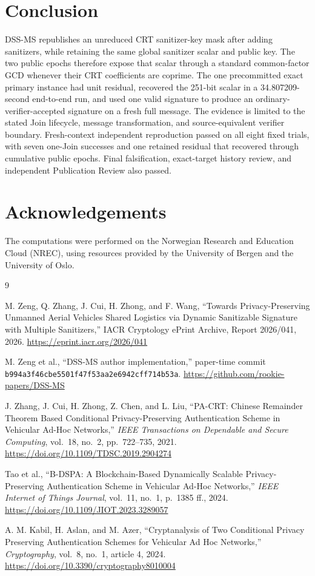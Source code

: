 \documentclass[10pt,a4paper]{article}
\begin{document}
\section{Conclusion}

DSS-MS republishes an unreduced CRT sanitizer-key mask after adding
sanitizers, while retaining the same global sanitizer scalar and public key.
The two public epochs therefore expose that scalar through a standard
common-factor GCD whenever their CRT coefficients are coprime. The one
precommitted exact primary instance had unit residual, recovered the 251-bit
scalar in a 34.807209-second end-to-end run, and used one valid signature to
produce an ordinary-verifier-accepted signature on a fresh full message. The
evidence is limited to the stated Join lifecycle, message transformation, and
source-equivalent verifier boundary. Fresh-context independent reproduction
passed on all eight fixed trials, with seven one-Join successes and one
retained residual that recovered through cumulative public epochs. Final
falsification, exact-target history review, and independent Publication Review
also passed.

\section*{Acknowledgements}
The computations were performed on the Norwegian Research and Education Cloud (NREC), using resources provided by the University of Bergen and the University of Oslo.

\begin{thebibliography}{9}

M. Zeng, Q. Zhang, J. Cui, H. Zhong, and F. Wang,
``Towards Privacy-Preserving Unmanned Aerial Vehicles Shared Logistics via
Dynamic Sanitizable Signature with Multiple Sanitizers,''
IACR Cryptology ePrint Archive, Report 2026/041, 2026.
\url{https://eprint.iacr.org/2026/041}

M. Zeng et al.,
``DSS-MS author implementation,'' paper-time commit
\texttt{b994a3f46cbe5501f47f53aa2e6942cff714b53a}.
\url{https://github.com/rookie-papers/DSS-MS}

J. Zhang, J. Cui, H. Zhong, Z. Chen, and L. Liu,
``PA-CRT: Chinese Remainder Theorem Based Conditional Privacy-Preserving
Authentication Scheme in Vehicular Ad-Hoc Networks,''
\emph{IEEE Transactions on Dependable and Secure Computing}, vol.~18, no.~2,
pp.~722--735, 2021.
\url{https://doi.org/10.1109/TDSC.2019.2904274}

Tao et al.,
``B-DSPA: A Blockchain-Based Dynamically Scalable Privacy-Preserving
Authentication Scheme in Vehicular Ad-Hoc Networks,''
\emph{IEEE Internet of Things Journal}, vol.~11, no.~1, p.~1385 ff., 2024.
\url{https://doi.org/10.1109/JIOT.2023.3289057}

A. M. Kabil, H. Aslan, and M. Azer,
``Cryptanalysis of Two Conditional Privacy Preserving Authentication Schemes
for Vehicular Ad Hoc Networks,''
\emph{Cryptography}, vol.~8, no.~1, article 4, 2024.
\url{https://doi.org/10.3390/cryptography8010004}

\end{thebibliography}
\end{document}
